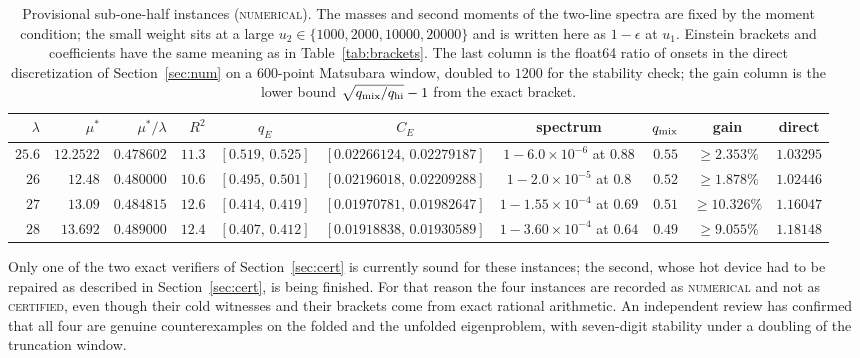 \documentclass[11pt]{article}
\newcommand{\CE}{C_E}
\newcommand{\muS}{\mu^{*}}
\theoremstyle{definition}
\theoremstyle{remark}
\begin{document}
\begin{table}[t]
\centering
\scriptsize
\setlength{\tabcolsep}{2.5pt}
\renewcommand{\arraystretch}{1.15}
\begin{tabular}{@{}rrrrcccccc@{}}
\toprule
$\lambda$ & $\muS$ & $\muS/\lambda$ & $R^2$ & $q_E$ & $\CE$ & spectrum & $q_{\rm mix}$ & gain & direct\\
\midrule
$25.6$ & $12.2522$ & $0.478602$ & $11.3$ & $[0.519,\,0.525]$ & $[0.02266124,\,0.02279187]$ &
$1-6.0\times10^{-6}$ at $0.88$ & $0.55$ & $\ge2.353\%$ & $1.03295$\\
$26$ & $12.48$ & $0.480000$ & $10.6$ & $[0.495,\,0.501]$ & $[0.02196018,\,0.02209288]$ &
$1-2.0\times10^{-5}$ at $0.8$ & $0.52$ & $\ge1.878\%$ & $1.02446$\\
$27$ & $13.09$ & $0.484815$ & $12.6$ & $[0.414,\,0.419]$ & $[0.01970781,\,0.01982647]$ &
$1-1.55\times10^{-4}$ at $0.69$ & $0.51$ & $\ge10.326\%$ & $1.16047$\\
$28$ & $13.692$ & $0.489000$ & $12.4$ & $[0.407,\,0.412]$ & $[0.01918838,\,0.01930589]$ &
$1-3.60\times10^{-4}$ at $0.64$ & $0.49$ & $\ge9.055\%$ & $1.18148$\\
\bottomrule
\end{tabular}
\caption{Provisional sub-one-half instances (\textsc{numerical}). The masses and second
moments of the two-line spectra are fixed by the moment condition; the small weight sits at
a large $u_2\in\{1000,2000,10000,20000\}$ and is written here as $1-\epsilon$ at $u_1$.
Einstein brackets and coefficients have the same meaning as in
Table~\ref{tab:brackets}. The last column is the float64 ratio of onsets in the direct
discretization of Section~\ref{sec:num} on a $600$-point Matsubara window, doubled to
$1200$ for the stability check; the gain column is the
lower bound $\sqrt{q_{\rm mix}/q_{\rm hi}}-1$ from the exact bracket.}
\label{tab:half}
\end{table}

Only one of the two exact verifiers of Section~\ref{sec:cert} is currently sound for these
instances; the second, whose hot device had to be repaired as described in
Section~\ref{sec:cert}, is being finished. For that reason the four instances are recorded
as \textsc{numerical} and not as \textsc{certified}, even though their cold witnesses and
their brackets come from exact rational arithmetic. An independent review has confirmed
that all four are genuine counterexamples on the folded and the unfolded eigenproblem, with
seven-digit stability under a doubling of the truncation window.
\end{document}
